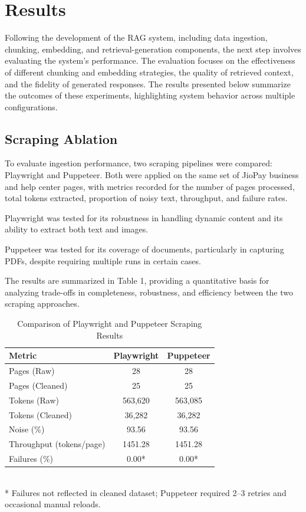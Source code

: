 \section{Results}
	Following the development of the RAG system, including data ingestion, chunking, embedding, and retrieval-generation components, the next step involves evaluating the system’s performance. The evaluation focuses on the effectiveness of different chunking and embedding strategies, the quality of retrieved context, and the fidelity of generated responses. The results presented below summarize the outcomes of these experiments, highlighting system behavior across multiple configurations.
	
\subsection{Scraping Ablation}
To evaluate ingestion performance, two scraping pipelines were compared: Playwright and Puppeteer. Both were applied on the same set of JioPay business and help center pages, with metrics recorded for the number of pages processed, total tokens extracted, proportion of noisy text, throughput, and failure rates.

Playwright was tested for its robustness in handling dynamic content and its ability to extract both text and images.

Puppeteer was tested for its coverage of documents, particularly in capturing PDFs, despite requiring multiple runs in certain cases.

The results are summarized in Table 1, providing a quantitative basis for analyzing trade-offs in completeness, robustness, and efficiency between the two scraping approaches.

\begin{table}[h!]
	\centering
	\caption{Comparison of Playwright and Puppeteer Scraping Results}
	\label{tab:scraping_results}
	\begin{tabular}{|l|c|c|}
		\hline
		\textbf{Metric}       & \textbf{Playwright} & \textbf{Puppeteer} \\ \hline
		Pages (Raw)           & 28                  & 28                 \\ \hline
		Pages (Cleaned)       & 25                  & 25                 \\ \hline
		Tokens (Raw)          & 563,620             & 563,085            \\ \hline
		Tokens (Cleaned)      & 36,282              & 36,282             \\ \hline
		Noise (\%)            & 93.56               & 93.56              \\ \hline
		Throughput (tokens/page) & 1451.28           & 1451.28            \\ \hline
		Failures (\%)         & 0.00*               & 0.00*              \\ \hline
	\end{tabular}
	\\[1ex]
	\footnotesize{* Failures not reflected in cleaned dataset; Puppeteer required 2–3 retries and occasional manual reloads.}
\end{table}

